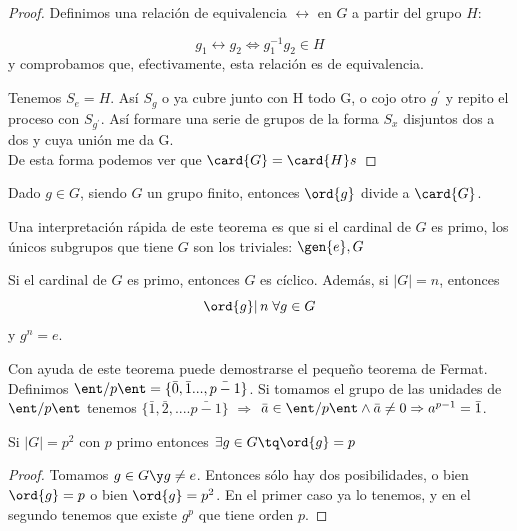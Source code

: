 \documentclass{apuntes}
\begin{document}
  \begin{proof} Definimos una relación de equivalencia $\rel$ en $G$ a partir del grupo $H$:
  
   \[ g_{1}\rel g_{2} \Leftrightarrow g_{1}^{-1}g_{2}\in H \]  y comprobamos que, efectivamente, esta relación es de equivalencia.
   
   Tenemos $S_{e}=H$. Así $S_{g}$  o ya cubre junto con H todo G, o cojo otro $g^{'}$  y repito el proceso con $S_{g^{'}}$.
   Así formare una serie de grupos de la forma $S_{x}$  disjuntos dos a dos y cuya unión me da G.\\
   De esta forma podemos ver que $\card{G}=\card{H}  s$
  \end{proof}
  
  \begin{theorem}
   Dado $g \in  G$, siendo $G$ un grupo finito, entonces $\ord{g}$ divide a $\card{G}$. 
  \end{theorem}
  
  Una interpretación rápida de este teorema es que si el cardinal de $G$ es primo, los únicos subgrupos que tiene $G$ son los triviales: $\gen{e}, G$
  
  \begin{theorem}
   Si el cardinal de $G$ es primo, entonces $G$ es cíclico. Además, si $|G|=n$, entonces \[ \ord{g} | \, n \; \forall g\in G\] y $g^n = e$.
  \end{theorem}
  
  \begin{example}
   Con ayuda de este teorema puede demostrarse el pequeño teorema de Fermat. 
   Definimos $\ent/p\ent=\{\bar{0},\bar{1}...,\bar{p-1}\}$.
   Si tomamos el grupo de las unidades de $\ent/p\ent$ tenemos $\{\bar{1}, \bar{2},....\bar{p-1}\}$ $\Rightarrow$
   $\bar{a}\in\ent/p\ent \wedge \bar{a}\neq 0 \Rightarrow a^{p-1}=\bar{1}$.
  \end{example}
  
  \begin{theorem}
   Si $|G|=p^{2}$  con $p$ primo entonces $\exists g \in G \tq \ord{g}=p$
  \end{theorem}
  
  \begin{proof}
   Tomamos $g\in G \y g\neq e$. Entonces sólo hay dos posibilidades, o bien $\ord{g}=p$ o bien $\ord{g}=p^{2}$. En el primer caso ya lo tenemos, y en el segundo tenemos que existe $g^p$ que tiene orden $p$.
  \end{proof}
  
\end{document}
